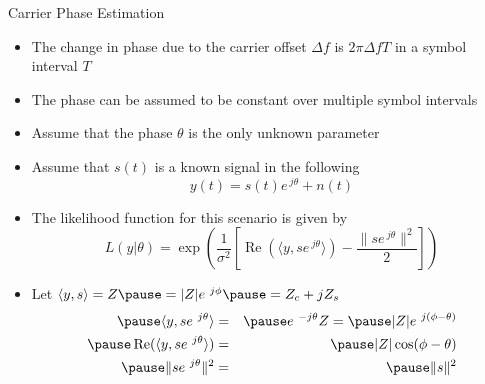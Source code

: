 \documentclass[t]{beamer}
\renewcommand\Re{\operatorname{Re}}
\begin{document}
\begin{frame}{Carrier Phase Estimation}
  \footnotesize
  \begin{itemize}
    \item The change in phase due to the carrier offset $\Delta f$ is $2\pi\Delta f T$ in a symbol interval $T$ 
    \item \pause The phase can be assumed to be constant over multiple symbol intervals
    \item \pause Assume that the phase $\theta$ is the only unknown parameter
    \item \pause Assume that $s(t)$ is a known signal in the following
      \begin{equation*}
        y(t) = s(t)e^{\ j\theta} + n(t)
      \end{equation*}
    \item \pause The likelihood function for this scenario is given by
      \begin{equation*}
        L(y|\theta) = \exp\left( \frac{1}{\sigma^2} \left[\Re(\langle y, s e^{\ j\theta}\rangle) - \frac{\lVert se^{\ j\theta} \rVert^2}{2} \right]\right)
      \end{equation*}
    \item \pause Let $\langle y, s \rangle = Z \pause = \lvert Z \rvert e^{\ j\phi} \pause = Z_c + jZ_s$
      \begin{eqnarray*}
        \pause \langle y, s e^{\ j\theta}\rangle & = & \pause e^{\ -j\theta}Z = \pause \lvert Z \rvert e^{\ j(\phi-\theta)} \\
        \pause \Re(\langle y, s e^{\ j\theta}\rangle) & = & \pause \lvert Z \rvert \cos (\phi-\theta)\\
        \pause \lVert se^{\ j\theta} \rVert^2  & = & \pause \lVert s \rVert^2
      \end{eqnarray*}
  \end{itemize} 
  \normalsize
\end{frame}
\end{document}
